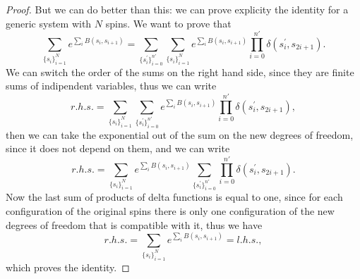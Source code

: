 \begin{proof}
    But we can do better than this: we can prove explicity the identity for a generic system with \(N\) spins. We want to prove that
    \[
        \sum_{\{s_i\}_{i=1}^N} e^{\sum_{i} B(s_i, s_{i+1})} = \sum_{\{s^{\prime}_i\}_{i=0}^{n'}} \sum_{\{s_i\}_{i=1}^N} e^{\sum_{i} B(s_{i}, s_{i+1})} \prod_{i=0}^{n'} \delta(s_i^{\prime}, s_{2i+1}).
    \]
    We can switch the order of the sums on the right hand side, since they are finite sums of indipendent variables, thus we can write
    \[
        r.h.s. = \sum_{\{s_i\}_{i=1}^N} \sum_{\{s^{\prime}_i\}_{i=0}^{n'}} e^{\sum_{i} B(s_{i}, s_{i+1})} \prod_{i=0}^{n'} \delta(s_i^{\prime}, s_{2i+1}),
    \]
    then we can take the exponential out of the sum on the new degrees of freedom, since it does not depend on them, and we can write
    \[
        r.h.s. = \sum_{\{s_i\}_{i=1}^N} e^{\sum_{i} B(s_{i}, s_{i+1})} \sum_{\{s^{\prime}_i\}_{i=0}^{n'}} \prod_{i=0}^{n'} \delta(s_i^{\prime}, s_{2i+1}).
    \]
    Now the last sum of products of delta functions is equal to one, since for each configuration of the original spins there is only one configuration of the new degrees of freedom that is compatible with it, thus we have
    \[
        r.h.s. = \sum_{\{s_i\}_{i=1}^N} e^{\sum_{i} B(s_{i}, s_{i+1})} = l.h.s.,
    \]
    which proves the identity.
\end{proof}

